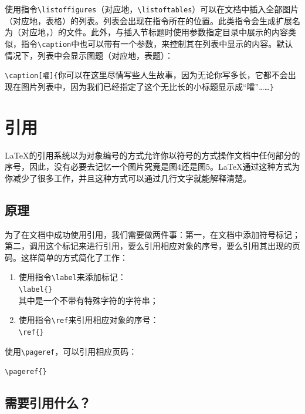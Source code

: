 使用指令\verb|\listoffigures|（对应地，\verb|\listoftables|）可以在文档中插入全部图片（对应地，表格）的列表。列表会出现在指令所在的位置。此类指令会生成扩展名为（对应地，）的文件。此外，与插入节标题时使用参数指定目录中展示的内容类似，指令\verb|\caption|中也可以带有一个参数，来控制其在列表中显示的内容。默认情况下，列表中会显示图题（对应地，表题）：

\begin{dmd}
\verb|\caption[嚯]{|你可以在这里尽情写些人生故事，因为无论你写多长，它都不会出现在图片列表中，因为我们已经指定了这个无比长的小标题显示成“嚯”……\verb|}|
\end{dmd}

\section{引用}

\LaTeX 的引用系统以为对象编号的方式允许你以符号的方式操作文档中任何部分的序号，因此，没有必要去记忆一个图片究竟是图4还是图5。\LaTeX 通过这种方式为你减少了很多工作，并且这种方式可以通过几行文字就能解释清楚。

\subsection{原理}

为了在文档中成功使用引用，我们需要做两件事：第一，在文档中添加符号标记；第二，调用这个标记来进行引用，要么引用相应对象的序号，要么引用其出现的页码。这样简单的方式简化了工作：

\begin{enumerate}
  \item 使用指令\verb|\label|来添加标记：\\
  \verb|\label{|\verb|}|\\
  其中是一个不带有特殊字符的字符串；
  \item 使用指令\verb|\ref|来引用相应对象的序号：\\
  \verb|\ref{|\verb|}|
\end{enumerate}

使用\verb|\pageref|，可以引用相应页码：

\verb|\pageref{|\verb|}|

\subsection{需要引用什么？}

